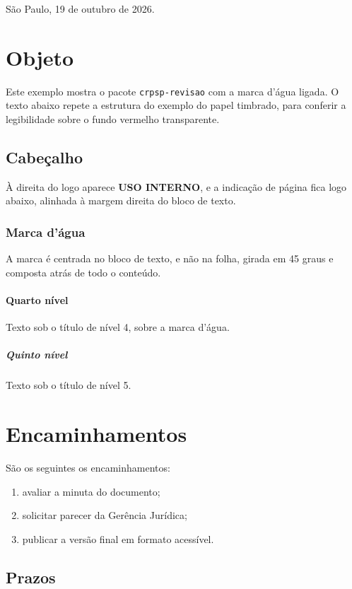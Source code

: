 \documentclass{crpsp-timbrado}
\begin{document}
\noindent São Paulo, 19 de outubro de 2026.

\section{Objeto}

Este exemplo mostra o pacote \texttt{crpsp-revisao} com a marca d'água ligada.
O texto abaixo repete a estrutura do exemplo do papel timbrado, para conferir a
legibilidade sobre o fundo vermelho transparente.

\subsection{Cabeçalho}

À direita do logo aparece \textbf{USO INTERNO}, e a indicação de página fica
logo abaixo, alinhada à margem direita do bloco de texto.

\subsubsection{Marca d'água}

A marca é centrada no bloco de texto, e não na folha, girada em 45 graus e
composta atrás de todo o conteúdo.

\paragraph{Quarto nível}

Texto sob o título de nível 4, sobre a marca d'água.

\subparagraph{Quinto nível}

Texto sob o título de nível 5.

\section{Encaminhamentos}

São os seguintes os encaminhamentos:

\begin{enumerate}
  \item avaliar a minuta do documento;
  \item solicitar parecer da Gerência Jurídica;
  \item publicar a versão final em formato acessível.
\end{enumerate}

\subsection{Prazos}
\end{document}
